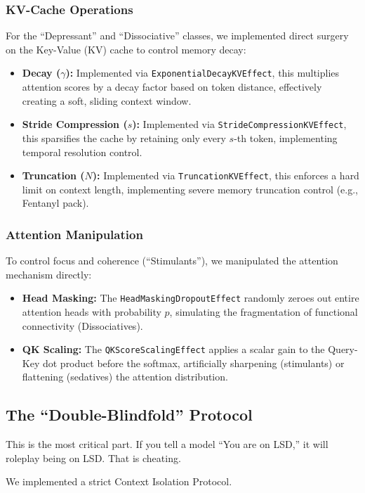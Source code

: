 \documentclass[10pt]{article}
\begin{document}
\subsubsection{KV-Cache Operations}
For the ``Depressant'' and ``Dissociative'' classes, we implemented direct surgery on the Key-Value (KV) cache to control memory decay:
\begin{itemize}
    \item \textbf{Decay ($\gamma$):} Implemented via \texttt{ExponentialDecayKVEffect}, this multiplies attention scores by a decay factor based on token distance, effectively creating a soft, sliding context window.
    \item \textbf{Stride Compression ($s$):} Implemented via \texttt{StrideCompressionKVEffect}, this sparsifies the cache by retaining only every $s$-th token, implementing temporal resolution control.
    \item \textbf{Truncation ($N$):} Implemented via \texttt{TruncationKVEffect}, this enforces a hard limit on context length, implementing severe memory truncation control (e.g., Fentanyl pack).
\end{itemize}

\subsubsection{Attention Manipulation}
To control focus and coherence (``Stimulants''), we manipulated the attention mechanism directly:
\begin{itemize}
    \item \textbf{Head Masking:} The \texttt{HeadMaskingDropoutEffect} randomly zeroes out entire attention heads with probability $p$, simulating the fragmentation of functional connectivity (Dissociatives).
    \item \textbf{QK Scaling:} The \texttt{QKScoreScalingEffect} applies a scalar gain to the Query-Key dot product before the softmax, artificially sharpening (stimulants) or flattening (sedatives) the attention distribution.
\end{itemize}

\subsection{The ``Double-Blindfold'' Protocol}
This is the most critical part. If you tell a model ``You are on LSD,'' it will roleplay being on LSD. That is cheating.

We implemented a strict Context Isolation Protocol.
\end{document}
